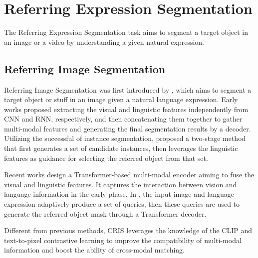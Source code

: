 
\section{Referring Expression Segmentation}
\vspace{-2mm}
The Referring Expression Segmentation task aims to segment a target object in an image or a video by understanding a given natural expression.

\subsection{Referring Image Segmentation}


\vspace{-2mm}
Referring Image Segmentation was first introduced by \cite{hu_segmentation_2016}, which aims to segment a target object or stuff in an image given a natural language expression. Early works proposed extracting the visual and linguistic features independently from CNN and RNN, respectively, and then concatenating them together to gather multi-modal features and generating the final segmentation results by a decoder. Utilizing the successful of instance segmentation, \cite{yu_mattnet_2018} proposed a two-stage method that first generates a set of candidate instances, then leverages the linguistic features as guidance for selecting the referred object from that set. 

Recent works\cite{ding_vision-language_2021, yang_lavt_2022} design a Transformer-based multi-modal encoder aiming to fuse the visual and linguistic features. It captures the interaction between vision and language information in the early phase. In \cite{ding_vision-language_2021}, the input image and language expression adaptively produce a set of queries, then these queries are used to generate the referred object mask through a Transformer decoder.

Different from previous methods, CRIS\cite{wang_cris_2022} leverages the knowledge of the CLIP\cite{radford_learning_2021} and text-to-pixel contrastive learning to improve the compatibility of multi-modal information and boost the ability of cross-modal matching. 
